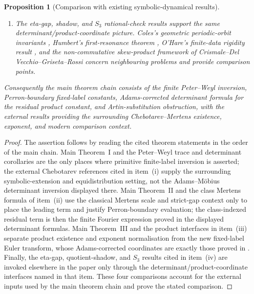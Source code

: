 \documentclass[11pt,a4paper]{amsart}
\theoremstyle{plain}
\newtheorem{proposition}[theorem]{Proposition}
\theoremstyle{definition}
\theoremstyle{remark}
\begin{document}
\begin{proposition}[Comparison with existing symbolic-dynamical results]
\begin{enumerate}[label=\textup{(\roman*)},leftmargin=*]
    ordinary periodic Artin logarithm
    \(\mathcal L_\varrho(\lambda^{-1})\) for
    \(F_\varrho(\lambda^{-1})\).
    \item The eta-gap, shadow, and \(S_3\) rational-check results support the
    same determinant/product-coordinate picture.  Coles's geometric
    periodic-orbit invariants \cite{Coles2025VassilievWritheAxiomA}, Humbert's
    first-resonance theorem \cite{Humbert2025FirstRuelleResonance}, O'Hare's
    finite-data rigidity result \cite{OHare2025FiniteDataRigidity}, and the
    non-commutative skew-product framework of Crismale--Del Vecchio--Griseta--Rossi
    \cite{CrismaleDelVecchioGrisetaRossi2025NoncommutativeSkewProduct} concern
    neighbouring problems and provide comparison points.
  \end{enumerate}
  Consequently the main theorem chain consists of the finite Peter--Weyl
  inversion, Perron-boundary fixed-label constants, Adams-corrected determinant
  formula for the residual product constant, and Artin-substitution obstruction,
  with the external results providing the surrounding Chebotarev--Mertens
  existence, exponent, and modern comparison context.
\end{proposition}

\begin{proof}
  The assertion follows by reading the cited theorem statements in the order of
  the main chain.  Main
  Theorem~I and the Peter--Weyl trace and determinant corollaries are the only
  places where primitive finite-label inversion is asserted; the external
  Chebotarev references cited in item~\textup{(i)} supply the surrounding
  symbolic-extension and equidistribution setting, not the Adams--M\"obius
  determinant inversion displayed there.  Main Theorem~II and the class Mertens
  formula of item~\textup{(ii)} use the classical Mertens scale and strict-gap
  context only to place the leading term and justify Perron-boundary evaluation;
  the class-indexed residual term is then the finite Fourier expression proved
  in the displayed determinant formulas.  Main Theorem~III and the product
  interfaces in item~\textup{(iii)} separate product existence and exponent
  normalisation from the new fixed-label Euler transform, whose Adams-corrected
  coordinates are exactly those proved in
  .
  Finally, the eta-gap, quotient-shadow, and \(S_3\) results cited in
  item~\textup{(iv)} are invoked elsewhere in the paper only through the
  determinant/product-coordinate interfaces named in that item.  These four
  comparisons account for the external inputs used by the main theorem chain
  and prove the stated comparison.
\end{proof}
\end{document}
